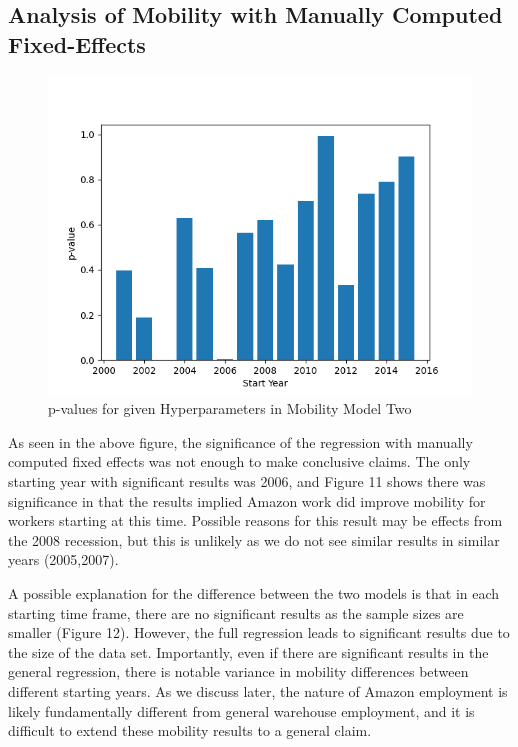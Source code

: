 \documentclass[11pt]{article}
\begin{document}
\subsection{Analysis of Mobility with Manually Computed Fixed-Effects}
\begin{figure}[H]
    \centering
    \includegraphics[width=13cm]{p-values_mob2.png}
    \caption{p-values for given Hyperparameters in Mobility Model Two}
\end{figure}


\-\hspace{0.5cm} As seen in the above figure, the significance of the regression with manually computed fixed effects was not enough to make conclusive claims. The only starting year with significant results was 2006, and Figure 11 shows there was significance in that the results implied Amazon work did improve mobility for workers starting at this time. Possible reasons for this result may be effects from the 2008 recession, but this is unlikely as we do not see similar results in similar years (2005,2007).

\-\hspace{0.5cm} A possible explanation for the difference between the two models is that in each starting time frame, there are no significant results as the sample sizes are smaller (Figure 12). However, the full regression leads to significant results due to the size of the data set. Importantly, even if there are significant results in the general regression, there is notable variance in mobility differences between different starting years. As we discuss later, the nature of Amazon employment is likely fundamentally different from general warehouse employment, and it is difficult to extend these mobility results to a general claim.
\end{document}
